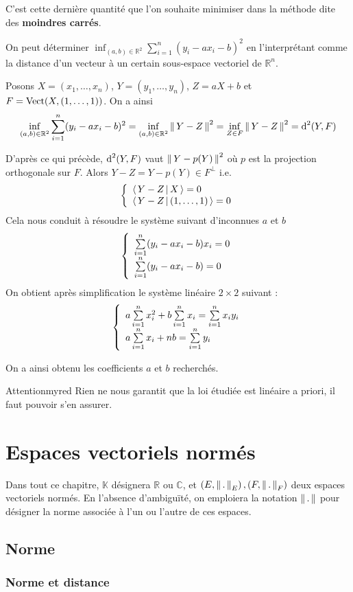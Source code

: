     C’est cette dernière quantité que l’on souhaite minimiser dans la méthode dite des \textbf{moindres carrés}.

    On peut déterminer $\inf_{(a,b) \in \mathbb{R}^2} \sum\limits_{i=1}^n (y_i -ax_i - b)^2$ en l’interprétant comme la distance d’un vecteur à un certain sous-espace vectoriel de $\mathbb{R}^n$.

    Posons $X = (x_1,\ldots,x_n)$, $Y = (y_1,\ldots,y_n)$, $Z = aX + b$ et $F = \operatorname{Vect}(X,(1,\ldots,1))$. On a ainsi 
    \[ \inf_{(a,b) \in \mathbb{R}^2} \sum\limits_{i=1}^n (y_i -ax_i - b)^2 = \inf_{(a,b) \in \mathbb{R}^2} \left\lVert\,Y - Z\,\right\rVert^2 = \inf_{Z \in F} \left\lVert\,Y - Z\,\right\rVert^2 = \operatorname{d}^2(Y,F) \]
 
    D’après ce qui précède, $\operatorname{d}^2(Y,F)$ vaut $\left\lVert\,Y - p(Y)\,\right\rVert^2$ où $p$ est la projection orthogonale sur $F$. Alors $Y - Z = Y - p(Y) \in F^{\perp}$ i.e. 
    \[ \et{\spr{Y-Z}{X} = 0}{\spr{Y-Z}{(1,\ldots,1)} = 0} \] 
    Cela nous conduit à résoudre le système suivant d’inconnues $a$ et $b$ 
    \[ \et{\sum\limits_{i = 1}^n (y_i - ax_i - b)x_i = 0}{\sum\limits_{i = 1}^n (y_i - ax_i - b) = 0} \] 
    On obtient après simplification le système linéaire $2 \times 2$ suivant :
    \[ \et{a \sum\limits_{i = 1}^n x_i^2 + b \sum\limits_{i=1}^n x_i = \sum\limits_{i=1}^n x_i y_i}{a \sum\limits_{i=1}^n x_i + nb = \sum\limits_{i = 1}^n y_i} \]

    On a ainsi obtenu les coefficients $a$ et $b$ recherchés. 

    \begin{omed}{Attention}{myred}
        Rien ne nous garantit que la loi étudiée est linéaire a priori, il faut pouvoir s’en assurer.
    \end{omed}

\section{Espaces vectoriels normés}

Dans tout ce chapitre, $\mathbb{K}$ désignera $\mathbb{R}$ ou $\mathbb{C}$, et $\left(E,\left\lVert\,.\,\right\rVert_E\right), \left(F, \left\lVert\,.\,\right\rVert_F\right)$ deux espaces vectoriels normés. En l’absence d’ambiguïté, on emploiera la notation $\left\lVert\,.\,\right\rVert$ pour désigner la norme associée à l’un ou l’autre de ces espaces.

\subsection{Norme}

    \subsubsection{Norme et distance}

